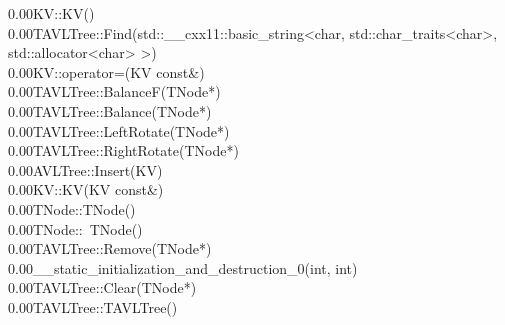 \documentclass[pdf, unicode, 12pt, a4paper,oneside,fleqn]{article}
\begin{document}
\begin{tabbing}
0.00\>KV::KV() \\

0.00\>TAVLTree::Find(std::\_\_cxx11::basic\_string<char, std::char\_traits<char>, std::allocator<char> >) \\

0.00\>KV::operator=(KV const\&) \\

0.00\>TAVLTree::BalanceF(TNode*) \\

0.00\>TAVLTree::Balance(TNode*) \\

0.00\>TAVLTree::LeftRotate(TNode*) \\

0.00\>TAVLTree::RightRotate(TNode*) \\

0.00\>AVLTree::Insert(KV) \\

0.00\>KV::KV(KV const\&) \\

0.00\>TNode::TNode() \\

0.00\>TNode::~TNode() \\

0.00\>TAVLTree::Remove(TNode*) \\

0.00\>\_\_static\_initialization\_and\_destruction\_0(int, int) \\

0.00\>TAVLTree::Clear(TNode*) \\

0.00\>TAVLTree::TAVLTree() \\


\end{tabbing}
\end{document}
